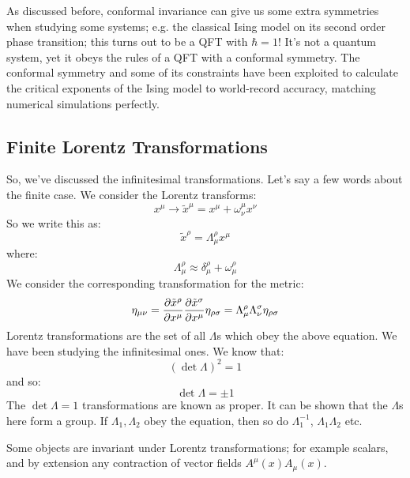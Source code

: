 As discussed before, conformal invariance can give us some extra symmetries when studying some systems; e.g. the classical Ising model on its second order phase transition; this turns out to be a QFT with $\hbar = 1$! It's not a quantum system, yet it obeys the rules of a QFT with a conformal symmetry. The conformal symmetry and some of its constraints have been exploited to calculate the critical exponents of the Ising model to world-record accuracy, matching numerical simulations perfectly.

\subsection{Finite Lorentz Transformations}
So, we've discussed the infinitesimal transformations. Let's say a few words about the finite case. We consider the Lorentz transforms:
\begin{equation}
    x^\mu \to \tilde{x}^\mu = x^\mu + \omega^\mu_\nu x^\nu
\end{equation}
So we write this as:
\begin{equation}
    \tilde{x}^\rho = \Lambda^\rho_{\mu}x^\mu
\end{equation}
where:
\begin{equation}
    \Lambda_\mu^\rho \approx \delta^\rho_\mu + \omega^\rho_\mu
\end{equation}
We consider the corresponding transformation for the metric:
\begin{equation}
    \eta_{\mu\nu} = \frac{\partial \tilde{x}^\rho}{\partial x^\mu}\frac{\partial \tilde{x}^\sigma}{\partial x^\mu}\eta_{\rho\sigma} = \Lambda^\rho_\mu \Lambda^\sigma_\nu \eta_{\rho\sigma}
\end{equation}
Lorentz transformations are the set of all $\Lambda$s which obey the above equation. We have been studying the infinitesimal ones. We know that:
\begin{equation}
    (\det \Lambda)^2 = 1
\end{equation}
and so:
\begin{equation}
    \det \Lambda = \pm 1
\end{equation}
The $\det \Lambda = 1$ transformations are known as proper. It can be shown that the $\Lambda$s here form a group. If $\Lambda_1, \Lambda_2$ obey the equation, then so do $\Lambda_1^{-1}$, $\Lambda_1\Lambda_2$ etc.

Some objects are invariant under Lorentz transformations; for example scalars, and by extension any contraction of vector fields $A^\mu(x) A_\mu(x)$.